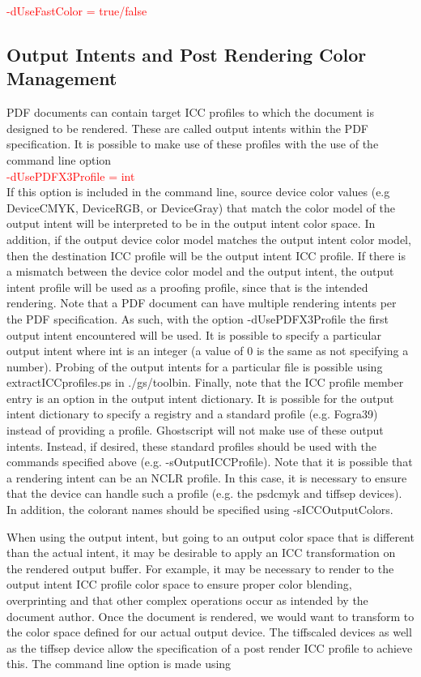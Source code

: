 \documentclass[12pt,notitlepage]{article}
\begin{document}
\textcolor{red}{-dUseFastColor = true/false}\\

\subsection{Output Intents and Post Rendering Color Management}
\label{sec:Transparency}
PDF documents can contain target ICC profiles to which the document is designed to be rendered.  These are called output intents within the PDF specification.   It is possible to make use of these profiles with the use of the command line option\\

\textcolor{red}{-dUsePDFX3Profile = int}\\

If this option is included in the command line, source device color values (e.g DeviceCMYK, DeviceRGB, or DeviceGray) that match the color model of the output intent will be interpreted to be in the output intent color space. In addition, if the output device color model matches the output intent color model, then the destination ICC profile will be the output intent ICC profile. If there is a mismatch between the device color model and the output intent, the output intent profile will be used as a proofing profile, since that is the intended rendering. Note that a PDF document can have multiple rendering intents per the PDF specification. As such, with the option -dUsePDFX3Profile the first output intent encountered will be used. It is possible to specify a particular output intent where int is an integer (a value of 0 is the same as not specifying a number). Probing of the output intents for a particular file is possible using extractICCprofiles.ps in ./gs/toolbin. Finally, note that the ICC profile member entry is an option in the output intent dictionary. It is possible for the output intent dictionary to specify a registry and a standard profile (e.g. Fogra39) instead of providing a profile. Ghostscript will not make use of these output intents. Instead, if desired, these standard profiles should be used with the commands specified above (e.g. -sOutputICCProfile).  Note that it is possible that a rendering intent can be an NCLR profile.  In this case, it is necessary to ensure that the device can handle such a profile (e.g. the psdcmyk and tiffsep devices).  In addition, the colorant names should be specified using -sICCOutputColors.

When using the output intent, but going to an output color space that is different than the actual intent, it may be desirable to apply an ICC transformation on the rendered output buffer.  For example, it may be necessary to render to the output intent ICC profile color space to ensure proper color blending, overprinting and that other complex operations occur as intended by the document author.   Once the document is rendered, we would want to transform to the color space defined for our actual output device.   The tiffscaled devices as well as the tiffsep device allow the specification of a post render ICC profile to achieve this.   The command line option is made using\\
\end{document}
